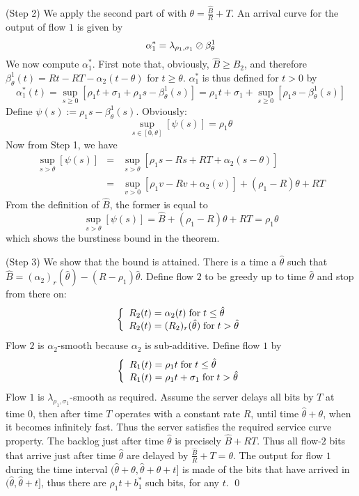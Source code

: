 (Step 2) We apply the second part of  with
$\theta=\frac{\hat{B}}{R}+T$. An arrival curve for the output of
flow $1$ is given by
$$\alpha_1^* = \lambda_{\rho_1, \sigma_1} \oslash \beta^1_{\theta}$$
We now compute $\alpha_1^*$. First note that, obviously, $\hat{B}
\geq B_2 $,  and therefore $\beta^1_{\theta}(t)= Rt-RT -
\alpha_2(t-\theta)$ for $t \geq \theta$. $\alpha_1^*$ is thus
defined for $t>0$ by
$$\alpha_1^*(t) = \sup_{s \geq 0} \left[
\rho_1 t + \sigma_1 +\rho_1 s - \beta^1_{\theta}(s)
 \right]
 =\rho_1 t + \sigma_1 + \sup_{s \geq 0}\left[
\rho_1 s - \beta^1_{\theta}(s) \right]
$$
Define $\psi(s):=\rho_1 s - \beta^1_{\theta}(s)$. Obviously:
$$\sup_{s \in [0, \theta]} [\psi(s)]=\rho_1 \theta$$
Now from Step 1, we have
\begin{eqnarray*}
\sup_{s > \theta}[\psi(s)]&=& \sup_{s > \theta} \left[\rho_1 s -
Rs+RT + \alpha_2(s-\theta) \right]\\ &=& \sup_{v >0} \left[\rho_1
v - Rv +\alpha_2(v)\right] + (\rho_1-R) \theta +R T
\end{eqnarray*}
From the definition of $\hat{B}$, the former is equal to
$$
 \sup_{s > \theta}[\psi(s)] = \hat{B} + (\rho_1-R) \theta +R T =\rho_1
 \theta
$$
which shows the burstiness bound in the theorem.

(Step 3) We show that the bound is attained. There is a time a
$\hat{\theta}$ such that $\hat{B}=
(\alpha_2)_r(\hat{\theta})-(R-\rho_1)\hat{\theta}$. Define flow
$2$ to be greedy up to time $\hat{\theta}$ and stop from there on:
$$ \left\{\begin{array}{l} 
 R_2(t) = \alpha_2(t) \mathrm{\; for \; } t \leq \hat{\theta} \\
 R_2(t) = (R_2)_r(\hat{\theta})  \mathrm{\; for \; } t > \hat{\theta}
  \end{array} \right.
 $$
Flow $2$ is $\alpha_2$-smooth because $\alpha_2$ is sub-additive.
Define flow $1$ by
$$
\left\{\begin{array}{l} 
 R_1(t) =\rho_1 t \mathrm{\; for \; } t \leq \hat{\theta} \\
 R_1(t) =\rho_1 t + \sigma_1 \mathrm{\; for \; } t > \hat{\theta}
  \end{array} \right.
$$
Flow $1$ is $\lambda_{\rho_1, \sigma_1}$-smooth as required.
Assume the server delays all bits by $T$ at time $0$, then after
time $T$ operates with a constant rate $R$, until time
$\hat{\theta}+ \theta$, when it becomes infinitely fast. Thus the
server satisfies the required service curve property. The backlog
just after time $\hat{\theta}$ is precisely $\hat{B}+RT$. Thus all
flow-$2$ bits that arrive just after time $\hat{\theta}$ are
delayed by $\frac{\hat{B}}{R}+T=\theta$. The output for flow $1$
during the time interval $(\hat{\theta}+ \theta, \hat{\theta}+
\theta + t]$ is made of the bits that have arrived in
$(\hat{\theta}, \hat{\theta}+t]$, thus there are $\rho_1 t +
b^*_1$ such bits, for any $t$. \qed

